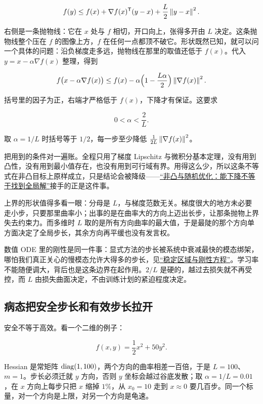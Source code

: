 \[
f(y)\le f(x)+\nabla f(x)^{\mathsf{T}}(y-x)+\frac{L}{2}\left\lVert y-x\right\rVert^2 .
\]

右侧是一条抛物线：它在 \(x\) 处与 \(f\) 相切，开口向上，张得多开由 \(L\) 决定。这条抛物线整个压在 \(f\) 的图像上方，\(f\) 在任何一点都顶不破它。形状既然已知，就可以问一个具体的问题：沿负梯度走多远，抛物线在那里的取值还低于 \(f(x)\)。代入 \(y=x-\alpha\nabla f(x)\) 整理，得到

\[
f\bigl(x-\alpha\nabla f(x)\bigr)
\le
f(x)-\alpha\Bigl(1-\frac{L\alpha}{2}\Bigr)\left\lVert\nabla f(x)\right\rVert^2 .
\]

括号里的因子为正，右端才严格低于 \(f(x)\)，下降才有保证。这要求

\[
0<\alpha<\frac{2}{L}.
\]

取 \(\alpha=1/L\) 时括号等于 \(1/2\)，每一步至少降低 \(\frac{1}{2L}\left\lVert\nabla f(x)\right\rVert^2\)。

把用到的条件对一遍账。全程只用了梯度 Lipschitz 与微积分基本定理，没有用到凸性，没有用到最小值存在，也没有用到可行域有界。用得这么少，所以这条不等式在非凸目标上原样成立，只是结论会被降级——\hyperref[ch:078]{``非凸与随机优化：能下降不等于找到全局解''}接手的正是这件事。

上界的形状值得多看一眼：分母是 \(L\)，与梯度范数无关。梯度很大的地方未必要走小步，只要那里曲率小；出事的是在曲率大的方向上迈出长步，让那条抛物上界失去约束力。而多维时 \(L\) 取的是所有方向曲率的最大值，于是最陡的那个方向单方面决定了全局步长，其余方向再平缓也没有发言权。

数值 ODE 里的刚性是同一件事：显式方法的步长被系统中衰减最快的模态绑架，哪怕我们真正关心的慢模态允许大得多的步长，见\hyperref[sec:08-Numerical-Analysis/06-ODE/03]{``稳定区域与刚性方程''}。学习率不能随便调大，背后也是这条边界在起作用。\(2/L\) 是硬的，越过去损失就不再受控，而 \(L\) 由损失曲面决定，不由训练计划的紧迫程度决定。

\subsection{病态把安全步长和有效步长拉开}

安全不等于高效。看一个二维的例子：

\[
f(x,y)=\frac{1}{2}x^2+50y^2 .
\]

Hessian 是常矩阵 \(\operatorname{diag}(1,100)\)，两个方向的曲率相差一百倍，于是 \(L=100\)、\(m=1\)。步长必须迁就 \(y\) 方向，否则 \(y\) 坐标会越过谷底发散；取 \(\alpha=1/L=0.01\)，在 \(x\) 方向上每步只把 \(x\) 缩掉 \(1\%\)，从 \(x_0=10\) 走到 \(x\approx0\) 要几百步。同一个标量，对一个方向是上限，对另一个方向是龟速。


